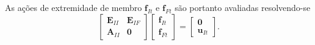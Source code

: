 As ações de extremidade de membro $\mathbf{f}_{It}$ e $\mathbf{f}_{Ft}$ são portanto avaliadas resolvendo-se
\begin{equation}
	\begin{bmatrix}
		\mathbf{E}_{II} & \mathbf{E}_{IF} \\
		\mathbf{A}_{II} & \mathbf{0}
	\end{bmatrix}
	\begin{bmatrix}
		\mathbf{f}_{It} \\
		\mathbf{f}_{Ft}
	\end{bmatrix}
	=
	\begin{bmatrix}
		\mathbf{0} \\
		\mathbf{u}_{It}
	\end{bmatrix}
	.
\end{equation}